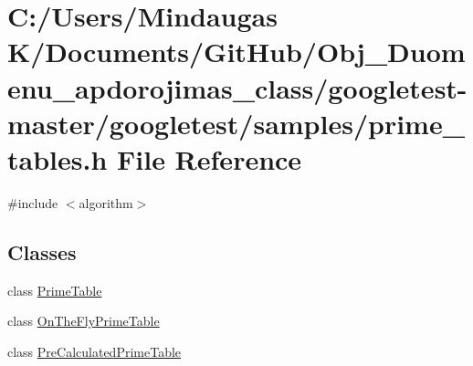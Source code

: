 \hypertarget{googletest-master_2googletest_2samples_2prime__tables_8h}{}\section{C\+:/\+Users/\+Mindaugas K/\+Documents/\+Git\+Hub/\+Obj\+\_\+\+Duomenu\+\_\+apdorojimas\+\_\+class/googletest-\/master/googletest/samples/prime\+\_\+tables.h File Reference}
\label{googletest-master_2googletest_2samples_2prime__tables_8h}
{\ttfamily \#include $<$algorithm$>$}\newline
\subsection*{Classes}
\begin{DoxyCompactItemize}
\item 
class \mbox{\hyperlink{class_prime_table}{Prime\+Table}}
\item 
class \mbox{\hyperlink{class_on_the_fly_prime_table}{On\+The\+Fly\+Prime\+Table}}
\item 
class \mbox{\hyperlink{class_pre_calculated_prime_table}{Pre\+Calculated\+Prime\+Table}}
\end{DoxyCompactItemize}

